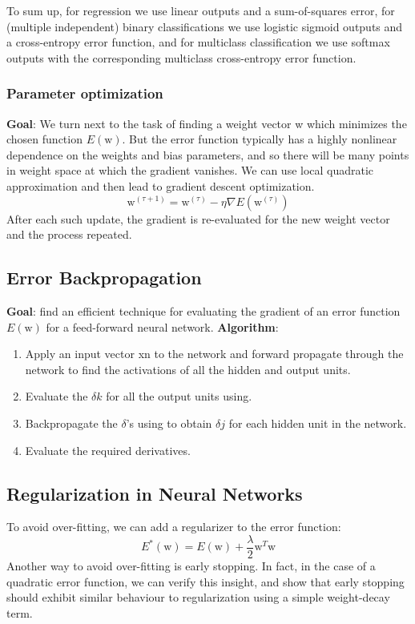 \documentclass[a4paper]{book}
\begin{document}
To sum up, for regression we use linear outputs and a sum-of-squares error, for (multiple independent) binary classifications we use logistic sigmoid outputs and a cross-entropy error function, and for multiclass classification we use softmax outputs with the corresponding multiclass cross-entropy error function.
\subsubsection{Parameter optimization}
\textbf{Goal}: We turn next to the task of finding a weight vector w which minimizes the chosen function $E(\mathrm w)$.\newline
But the error function typically has a highly nonlinear dependence on the weights and bias parameters, and so there will be many points in weight space at which the gradient vanishes.\newline
We can use local quadratic approximation and then lead to gradient descent optimization.
\begin{equation}\label{eq3.4.5}
  \mathrm w^{(\tau+1)} = \mathrm w^{(\tau)} -\eta\nabla E(\mathrm w^{(\tau)})
\end{equation}
After each such update, the gradient is re-evaluated for the new weight vector and the process repeated.
\subsection{Error Backpropagation}
\textbf{Goal}: find an efficient technique for evaluating  the gradient of an error function $E(\mathrm w)$ for a feed-forward neural network.
\textbf{Algorithm}:
\begin{enumerate}
  \item Apply an input vector xn to the network and forward propagate through the network to find the activations of all the hidden and output units.
  \item Evaluate the $\delta k$ for all the output units using.
  \item Backpropagate the $\delta$’s using to obtain $\delta j$ for each hidden unit in the network.
  \item Evaluate the required derivatives.
\end{enumerate}
\subsection{ Regularization in Neural Networks}
To avoid over-fitting, we can add a regularizer to the error function: $$E^*(\mathrm w) = E(\mathrm w) +\frac{\lambda}2\mathrm w^T\mathrm w$$
Another way to avoid over-fitting is early stopping.  In fact, in the case of a quadratic error function, we can verify this insight, and show that early stopping should exhibit similar behaviour to regularization using a simple weight-decay term.
\end{document}
